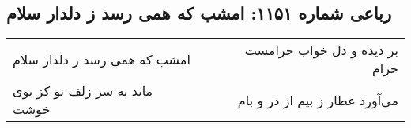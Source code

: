 \begin{center}
\section*{رباعی شماره ۱۱۵۱: امشب که همی رسد ز دلدار سلام}
\label{sec:1151}
\begin{longtable}{l p{0.5cm} r}
امشب که همی رسد ز دلدار سلام
&&
بر دیده و دل خواب حرامست حرام
\\
ماند به سر زلف تو کز بوی خوشت
&&
می‌آورد عطار ز بیم از در و بام
\\
\end{longtable}
\end{center}
